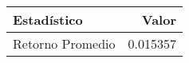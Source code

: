 \begin{table}[H]
\label{tab:retorno_promedio}
\centering
\begin{tabular}{lr}
Estad\'istico & Valor \\
\midrule
Retorno Promedio & 0.015357 \\
\end{tabular}
\end{table}
